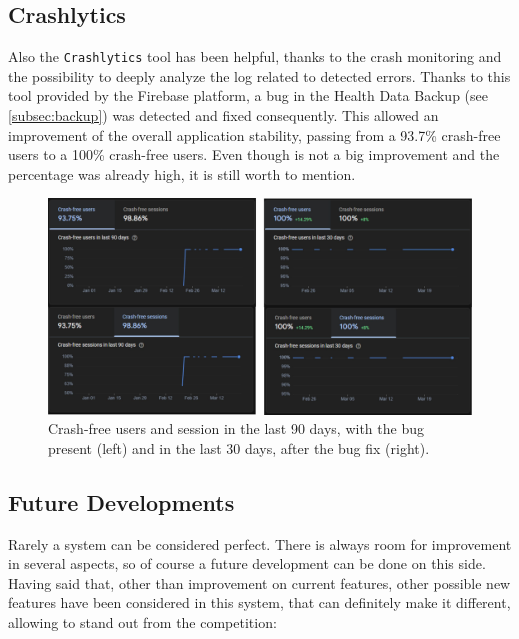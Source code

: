 \subsection{Crashlytics}
Also the \texttt{Crashlytics} tool has been helpful, thanks to the crash monitoring and the possibility to deeply analyze the log related to detected errors. Thanks to this tool provided by the Firebase platform, a bug in the Health Data Backup (see \cref{subsec:backup}) was detected and fixed consequently. This allowed an improvement of the overall application stability, passing from a 93.7\% crash-free users to a 100\% crash-free users. Even though is not a big improvement and the percentage was already high, it is still worth to mention.
\vspace{10ex}
\begin{figure}
    \includegraphics[width=1.0\linewidth]{./images/crashlytics.jpg}
    \caption{Crash-free users and session in the last 90 days, with the bug present (left) and in the last 30 days, after the bug fix (right).}
\end{figure}

\newpage
\subsection{Future Developments}
Rarely a system can be considered perfect. There is always room for improvement in several aspects, so of course a future development can be done on this side.
\newline Having said that, other than improvement on current features, other possible new features have been considered in this system, that can definitely make it different, allowing to stand out from the competition: 

